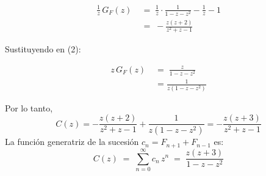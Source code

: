 \begin{solution}
\begin{align*}
 \frac{1}{z} \,G_F(z) \;&=\; \frac{1}{z} \cdot \frac{1}{1 - z - z^2}- \frac 1z  -1\\
\;&=\;
-\frac{z (z+2)}{z^2+z-1}   
\end{align*}

Sustituyendo en (2):

\begin{align*}
 z \,G_F(z) \;&=\;    \frac{z}{1 - z - z^2}\\
&=\frac{1}{z(1-z-z^2)}
\end{align*}


Por lo tanto,
\[
C(z)
= -\frac{z (z+2)}{z^2+z-1}  + \frac{1}{z(1-z-z^2)} 
= -\frac{z (z+3)}{z^2+z-1}
\]
La funci\'on generatriz de la sucesi\'on \(c_n = F_{n+1} + F_{n-1}\) es:
\[
\boxed{
C(z) \;=\; \sum_{n=0}^{\infty} c_n \, z^n
\;=\;
 \frac{z (z+3)}{1-z-z^2}
}
\]
\end{solution}
